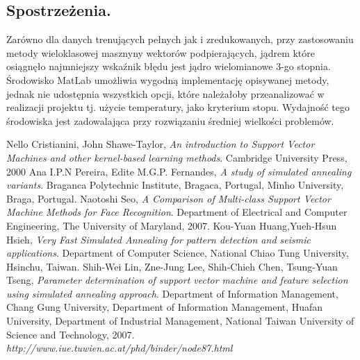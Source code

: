 \documentclass{article}
\begin{document}
\pgfplotsset{width=13cm, compat=1.4}
\begin{center}
\end{center}

\subsection{Spostrzeżenia.}
Zarówno dla danych trenujących pełnych jak i zredukowanych, przy zastosowaniu metody wieloklasowej 
masznyny wektorów podpierających, jądrem które osiągnęło najmniejszy wskaźnik błędu jest jądro wielomianowe
3-go stopnia.\linebreak
Środowisko MatLab umożliwia wygodną implementację opisywanej metody, jednak nie udostępnia wszystkich opcji, które
należałoby przeanalizować w realizacji projektu tj. użycie temperatury, jako kryterium stopu. Wydajność tego środowiska jest zadowalająca przy rozwiązaniu średniej wielkości problemów.

\pagebreak
\begin{thebibliography}{9}
Nello Cristianini, John Shawe-Taylor, \emph{An introduction to Support Vector Machines and other kernel-based learning methods}.
Cambridge University Press,
2000
Ana I.P.N Pereira, Edite M.G.P. Fernandes, \emph{A study of simulated annealing variants}.
Braganca Polytechnic Institute, Bragaca, Portugal,
Minho University, Braga, Portugal.
Naotoshi Seo, \emph{A Comparison of Multi-class Support Vector Machine Methods for Face Recognition}. 
Department of Electrical and Computer Engineering, The University of Maryland, 
2007.
Kou-Yuan Huang,Yueh-Hsun Hsieh, \emph{Very Fast Simulated Annealing for pattern detection and seismic applications}. Department of Computer Science, National Chiao Tung University, Hsinchu, Taiwan.
Shih-Wei Lin, Zne-Jung Lee, Shih-Chieh Chen, Tsung-Yuan Tseng, \emph{Parameter determination of support vector machine and feature selection using simulated annealing approach}. Department of Information Management, Chang Gung University, Department of Information Management, Huafan University, Department of Industrial Management, National Taiwan University of Science and Technology, 2007.
\emph{http://www.iue.tuwien.ac.at/phd/binder/node87.html}
\end{thebibliography}
\end{document}
